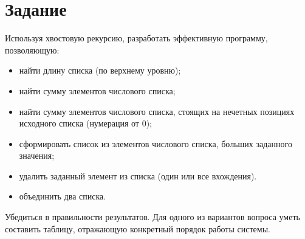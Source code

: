 \section{Задание}

Используя хвостовую рекурсию, разработать эффективную программу, позволяющую:
\begin{itemize}
    \item найти длину списка (по верхнему уровню);
    \item найти сумму элементов числового списка;
    \item найти сумму элементов числового списка, стоящих 
    на нечетных позициях исходного списка (нумерация от 0);
    \item сформировать список из элементов числового списка, больших заданного значения;
    \item удалить заданный элемент из списка (один или все вхождения).
    \item объединить два списка.
\end{itemize}

Убедиться в правильности результатов. Для одного из вариантов вопроса 
уметь составить таблицу, отражающую конкретный порядок работы системы.
